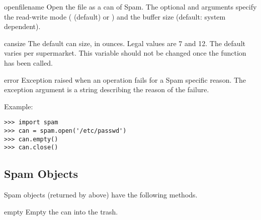 \begin{funcdesc}{open}{filename}
Open the file  as a can of Spam.  The optional
 and  arguments specify the read-write mode
( (default) or ) and the buffer size (default:
system dependent).
\end{funcdesc}


\begin{datadesc}{cansize}
The default can size, in ounces.  Legal values are 7 and 12.  The
default varies per supermarket.  This variable should not be changed
once the  function has been called.
\end{datadesc}


\begin{excdesc}{error}
Exception raised when an operation fails for a Spam specific reason.
The exception argument is a string describing the reason of the
failure.
\end{excdesc}




Example:

\begin{verbatim}
>>> import spam
>>> can = spam.open('/etc/passwd')
>>> can.empty()
>>> can.close()
\end{verbatim}


\subsection{Spam Objects}

Spam objects (returned by  above) have the following
methods.

\renewcommand{\indexsubitem}{(spam method)}

\begin{funcdesc}{empty}{}
Empty the can into the trash.
\end{funcdesc}
